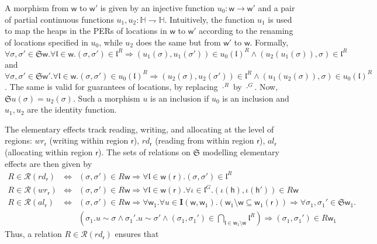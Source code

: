 \documentclass[orivec]{llncs}
\newif\iffull\fullfalse
\newcommand{\partfun}{\rightharpoondown}
\newcommand{\regid}{\ensuremath{\mathsf{r}}}
\newcommand{\Stores}{\ensuremath{\mathbb{H}}}
\newcommand{\aEff}[1]{\ensuremath{\mathit{al}_{#1}}}
\newcommand{\rEff}[1]{\ensuremath{\mathit{rd}_{#1}}}
\newcommand{\wEff}[1]{\ensuremath{\mathit{wr}_{#1}}}
\newcommand{\loc}{\mathfrak{l}}
\newcommand\w{\ensuremath{\mathsf{w}}\xspace}
\newcommand\heap{\ensuremath{\mathsf{h}}\xspace}
\newcommand{\Astores}{\mathfrak{S}}
\begin{document}
A morphism from $\w$ to $\w'$ is given by an injective function $u_0:
\w\rightarrow \w'$ and a pair of partial continuous functions
$u_1,u_2:\Stores\partfun\Stores$. Intuitively, the function $u_1$
is used
to map the heaps in the PERs of locations in $\w$ to $\w'$ according to the
renaming of locations specified in $u_0$, while $u_2$
does the same but from $\w'$ to $\w$. Formally,
$\forall \sigma,\sigma'\in\Astores \w.  \forall
\loc\in\w.(\sigma,\sigma')\in\loc^R\Rightarrow
(u_1(\sigma),u_1(\sigma'))\in u_0(\loc)^R \wedge
(u_2(u_1(\sigma)),\sigma)\in\loc^R$ and $\forall
\sigma,\sigma'\in\Astores \w'.  \forall
\loc\in\w.(\sigma,\sigma')\in u_0(\loc)^R \Rightarrow
(u_2(\sigma),u_2(\sigma'))\in \loc^R \wedge
(u_1(u_2(\sigma)),\sigma)\in u_0(\loc)^R$. The same is valid for 
guarantees of locations, by replacing $\cdot^R$ by $\cdot^G$.
Now, $\Astores
u(\sigma) = u_2(\sigma)$.  Such a morphism $u$ is an inclusion if
$u_0$ is an inclusion and $u_1,u_2$ are the identity function.

The elementary effects track reading, writing, and allocating at the
level of regions: $\wEff \regid$ (writing within
region $\regid$), $\rEff\regid$ (reading from within region $\regid$),
$\aEff\regid$ (allocating within region $\regid$).
The sets of relations on $\Astores$ modelling elementary effects are then
given by 
\iffull
\[
 \begin{array}{lll}
R\in\mathcal{R}(\rEff{\regid})& \iff & 
(\sigma,\sigma')\in R\w \Rightarrow \forall \loc\in\w(\regid).
(\sigma,\sigma')\in\loc^R\\[2pt]

R\in\mathcal{R}(\wEff{\regid})&\iff& 
(\sigma,\sigma')\in R\w \Rightarrow \forall \loc\in\w(\regid).\forall
\iota \in \loc^G. (\iota(\heap), \iota(\heap')) \in R\w\\[2pt]



R\in\mathcal{R}(\aEff{\regid})& \iff & 
(\sigma,\sigma')\in R\w \Rightarrow \forall \w_1.\forall
u\in\mathbf{I}(\w,\w_1).(\w_1\setminus \w \subseteq
\w_1(\regid))\Rightarrow \forall
\sigma_1,\sigma_1' \in\Astores\w_1.\\
&& (\sigma_1.u\sim\sigma \wedge
\sigma_1'.u\sim\sigma'\wedge(\sigma_1,\sigma_1')\in \bigcap_{\loc\in
\w_1\setminus \w}
\loc^R)\Rightarrow (\sigma_1,\sigma_1')\in R\w_1
 \end{array}
\]
Thus, a relation $R\in\mathcal{R}(\rEff{\regid})$ ensures that
\else
\end{document}
